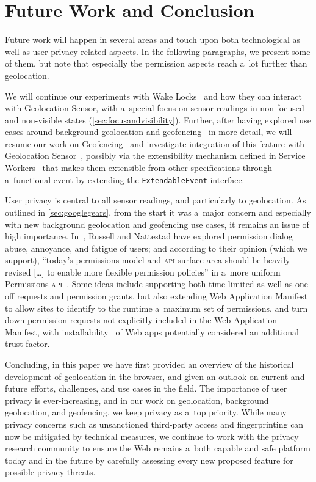 \documentclass[sigconf,hyphens]{acmart}
\begin{document}
\section{Future Work and Conclusion}

Future work will happen in several areas and touch upon both technological
as well as user privacy related aspects.
In the following paragraphs, we present some of them,
but note that especially the permission aspects reach a~lot further than geolocation.

We will continue our experiments with Wake Locks~\cite{steiner2018wakelock}
and how they can interact with Geolocation Sensor,
with a~special focus on sensor readings in non-focused and non-visible states
(\autoref{sec:focusandvisibility}).
Further, after having explored use cases around background geolocation
and geofencing~\cite{kostiainen2018geolocation} in more detail,
we will resume our work on Geofencing~\cite{kruisselbrink2017geofencing}
and investigate integration of this feature with Geolocation
Sensor~\cite{kostiainen2018geolocation}, possibly via the extensibility mechanism defined in Service
Workers~\cite{russell2017serviceworkers}
that makes them extensible from other specifications through a~functional event
by extending the \texttt{ExtendableEvent} interface.

User privacy is central to all sensor readings, and particularly to geolocation.
As outlined in \autoref{sec:googlegears}, from the start it was a~major concern
and especially with new background geolocation and geofencing use cases,
it remains an issue of high importance.
In~\cite{russell2018permissions}, Russell and Nattestad have explored permission dialog
abuse, annoyance, and fatigue of users; and according to their opinion (which we support),
``today's permissions model and \textsc{api} surface area should be heavily revised
[\ldots] to enable more flexible permission policies'' in a~more uniform
Permissions \textsc{api}~\cite{lamouri2017permissions}.
Some ideas include supporting both time-limited as well as one-off requests and permission grants,
but also extending Web Application Manifest~\cite{caceres2018manifest}
to allow sites to identify to the runtime a~maximum set of permissions,
and turn down permission requests not explicitly included in the Web Application Manifest,
with installability~\cite{caceres2018manifest} of Web apps potentially considered an additional
trust factor.

Concluding, in this paper we have first provided an overview
of the historical development of geolocation in the browser,
and given an outlook on current and future efforts, challenges, and use cases in the field.
The importance of user privacy is ever-increasing, and in our work on geolocation,
background geolocation, and geofencing,
we keep privacy as a~top priority.
While many privacy concerns such as unsanctioned third-party access and fingerprinting
can now be mitigated by technical measures, we continue to work with the privacy research community
to ensure the Web remains a~both capable and safe platform today and in the future
by carefully assessing every new proposed feature for possible privacy threats.
\end{document}
